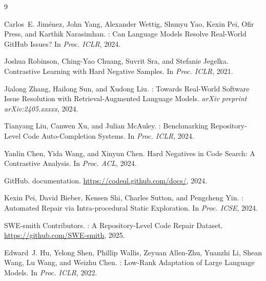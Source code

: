 \documentclass[11pt]{article}
\begin{document}
\begin{thebibliography}{9}

Carlos~E. Jim{\'e}nez, John Yang, Alexander Wettig, Shunyu Yao, Kexin Pei, Ofir Press, and Karthik Narasimhan.
: Can Language Models Resolve Real-World GitHub Issues?
\newblock In \emph{Proc. ICLR}, 2024.

Joshua Robinson, Ching-Yao Chuang, Suvrit Sra, and Stefanie Jegelka.
\newblock Contrastive Learning with Hard Negative Samples.
\newblock In \emph{Proc. ICLR}, 2021.

Jialong Zhang, Hailong Sun, and Xudong Liu.
: Towards Real-World Software Issue Resolution with Retrieval-Augmented Language Models.
\newblock \emph{arXiv preprint arXiv:2405.xxxxx}, 2024.

Tianyang Liu, Canwen Xu, and Julian McAuley.
: Benchmarking Repository-Level Code Auto-Completion Systems.
\newblock In \emph{Proc. ICLR}, 2024.

Yanlin Chen, Yida Wang, and Xinyun Chen.
\newblock Hard Negatives in Code Search: A Contrastive Analysis.
\newblock In \emph{Proc. ACL}, 2024.

GitHub.
 documentation.
\newblock \url{https://codeql.github.com/docs/}, 2024.

Kexin Pei, David Bieber, Kensen Shi, Charles Sutton, and Pengcheng Yin.
: Automated Repair via Intra-procedural Static Exploration.
\newblock In \emph{Proc. ICSE}, 2024.

SWE-smith Contributors.
: A Repository-Level Code Repair Dataset.
\newblock \url{https://github.com/SWE-smith}, 2025.

Edward~J. Hu, Yelong Shen, Phillip Wallis, Zeyuan Allen-Zhu, Yuanzhi Li, Shean Wang, Lu Wang, and Weizhu Chen.
: Low-Rank Adaptation of Large Language Models.
\newblock In \emph{Proc. ICLR}, 2022.

\end{thebibliography}
\end{document}
